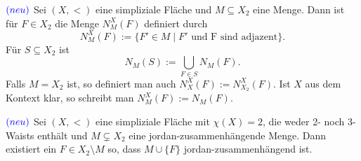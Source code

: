 \documentclass[12pt,titlepage]{article}
\begin{document}
\begin{definition} $\textcolor{blue}{(neu)}$ 
Sei $(X,<)$ eine simpliziale Fläche und $M \subseteq X_2$ eine Menge. Dann ist für $F \in X_2$ die Menge $N_M^X(F)$ definiert durch
\[
N_M^X(F):=\{ F' \in M \mid F'\text{ und F sind adjazent}\} .
\]
Für $S \subseteq X_2$ ist 
\[
N_M(S):=\bigcup_{F\in S}N_M(F).
\]
Falls $M=X_2$ ist, so definiert man auch $N_X^X(F):=N^X_{X_2}(F)$. Ist $X$ aus dem Kontext klar, so schreibt man $N_M^X(F):=N_M(F)$.
\end{definition}
\begin{lemma} \label{lemma1} $\textcolor{blue}{(neu)}$
Sei $(X,<)$  eine simpliziale Fläche mit $\chi (X)=2$, die weder 2- noch 3-Waists enthält und $M \subsetneq X_2$ eine jordan-zusammenhängende Menge. Dann existiert ein $F\in X_2\setminus M$ so, dass $M \cup \{F\}$ jordan-zusammenhängend ist.
\end{lemma}
\end{document}

